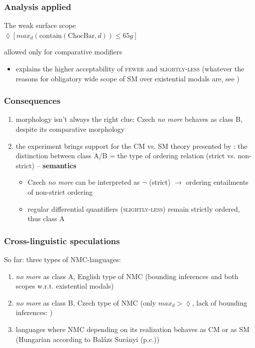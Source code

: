 \documentclass[10pt
]{beamer}
\newcommand{\cond}[1]{\textsc{#1}}
\begin{document}
\begin{frame}
  \frametitle{Analysis applied}

  The weak surface scope\\
  
  $\lozenge[max_d(\mathrm{contain}(\mathrm{ChocBar},d)) \leq 65g]$
  
  allowed only for comparative modifiers
  
\begin{itemize}
  \item explains the higher acceptability of \cond{fewer} and
  \cond{slightly-less} (whatever the reasons for obligatory wide scope of SM over existential modals are, see \cite{blok2019scope})
\end{itemize}
  
\end{frame}

\begin{frame}
  \frametitle{Consequences}

\begin{enumerate}
  \item morphology isn't always the right clue: Czech \textit{no more} behaves as class B, despite its comparative morphology
  \item the experiment brings support for the CM vs. SM theory presented by \cite{kennedy2015fregean}: the distinction between class A/B = the type of ordering relation (strict vs. non-strict) -- \textbf{semantics}

  \begin{itemize}
    \item Czech \textit{no more} can be interpreted as $\neg$ (strict) $\rightarrow$ ordering entailments of non-strict ordering
    \item regular differential quantifiers (\cond{slightly-less}) remain strictly ordered, thus class A
  \end{itemize}

\end{enumerate}

\end{frame}

\begin{frame}
  \frametitle{Cross-linguistic speculations}

  So far: three types of NMC-languages: 
  
  \begin{enumerate}
    \item \textit{no more} as class A, English type of NMC (bounding inferences and both scopes w.r.t. existential modals)
    \item \textit{no more} as class B, Czech type of NMC (only $max_d > \lozenge$, lack of bounding inferences: \cite{docekal_upper_2017})
    \item languages where NMC depending on its realization behaves as CM or as SM (Hungarian according to Balázs Surányi (p.c.))
  \end{enumerate}
  
\end{frame}
\end{document}
